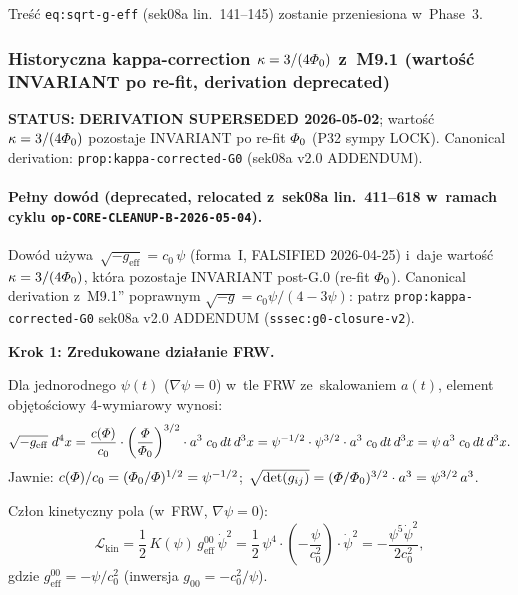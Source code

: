 \begin{remark}[Placeholder dla deprecated $\sqrt{-g}=c_0\varphi$]%
\label{rem:sqrt-g-orig-placeholder}
Tre\'s\'c \texttt{eq:sqrt-g-eff} (sek08a lin.~141--145) zostanie
przeniesiona w~Phase~3.
\end{remark}

\subsubsection{Historyczna kappa-correction $\kappa = 3/(4\varPhi_0)$
z~M9.1 (warto\'s\'c INVARIANT po re-fit, derivation deprecated)}%
\label{app:kappa-corrected-orig}

\textbf{STATUS:} \textbf{DERIVATION SUPERSEDED 2026-05-02}; warto\'s\'c
$\kappa = 3/(4\varPhi_0)$ pozostaje INVARIANT po re-fit $\varPhi_0$
(P32 sympy LOCK). Canonical derivation: \texttt{prop:kappa-corrected-G0}
(sek08a v2.0 ADDENDUM).

\paragraph{Pe\l{}ny dow\'od (deprecated, relocated z~sek08a lin.~411--618
w~ramach cyklu \texttt{op-CORE-CLEANUP-B-2026-05-04}).}

Dow\'od u\.zywa~$\sqrt{-g_{\mathrm{eff}}} = c_0\,\psi$ (forma~I,
FALSIFIED 2026-04-25) i~daje warto\'s\'c $\kappa = 3/(4\varPhi_0)$,
kt\'ora pozostaje INVARIANT post-G.0 (re-fit $\varPhi_0$). Canonical
derivation z~M9.1'' poprawnym $\sqrt{-g} = c_0\psi/(4-3\psi)$:
patrz \texttt{prop:kappa-corrected-G0} sek08a v2.0 ADDENDUM
(\texttt{sssec:g0-closure-v2}).

\textbf{Krok 1: Zredukowane dzia\l{}anie FRW.}

Dla jednorodnego $\psi(t)$ ($\nabla\psi = 0$) w~tle FRW
ze~skalowaniem $a(t)$, element obj\k{e}to\'sciowy 4-wymiarowy wynosi:
\begin{equation}\label{eq:volume-FRW}
  \sqrt{-g_{\mathrm{eff}}}\;d^4x
  = \frac{c(\varPhi)}{c_0}\cdot\left(\frac{\varPhi}{\varPhi_0}\right)^{3/2}
    \cdot a^3\;c_0\,dt\,d^3x
  = \psi^{-1/2}\cdot\psi^{3/2}\cdot a^3\;c_0\,dt\,d^3x
  = \psi\,a^3\;c_0\,dt\,d^3x.
\end{equation}
Jawnie: $c(\varPhi)/c_0 = (\varPhi_0/\varPhi)^{1/2} = \psi^{-1/2}$;
$\sqrt{\det(g_{ij})} = (\varPhi/\varPhi_0)^{3/2}\cdot a^3 = \psi^{3/2}\,a^3$.

Cz\l{}on kinetyczny pola (w~FRW, $\nabla\psi = 0$):
\begin{equation}\label{eq:Lkin-FRW}
  \mathcal{L}_{\mathrm{kin}}
  = \frac{1}{2}\,K(\psi)\,g_{\mathrm{eff}}^{00}\,\dot\psi^2
  = \frac{1}{2}\,\psi^4\cdot\left(-\frac{\psi}{c_0^2}\right)\cdot\dot\psi^2
  = -\frac{\psi^5\dot\psi^2}{2c_0^2},
\end{equation}
gdzie $g_{\mathrm{eff}}^{00} = -\psi/c_0^2$
(inwersja $g_{00} = -c_0^2/\psi$).

